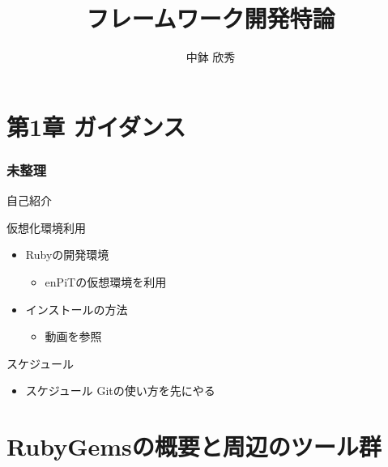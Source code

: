 \documentclass[t, aspectratio=169]{beamer}
\date{\insertpart}
\institute[AIIT]{産業技術大学院大学(AIIT)}
\author{中鉢 欣秀}
\date{}
\title{フレームワーク開発特論}
\begin{document}
\maketitle


\part{第1章 ガイダンス}
\label{sec-1}
\section{未整理}
\label{sec-1-1}
\begin{frame}[label=sec-1-1-1]{自己紹介}
\end{frame}

\begin{frame}[label=sec-1-1-2]{仮想化環境利用}
\begin{itemize}
\item Rubyの開発環境
\begin{itemize}
\item enPiTの仮想環境を利用
\end{itemize}
\item インストールの方法
\begin{itemize}
\item 動画を参照
\end{itemize}
\end{itemize}
\end{frame}

\begin{frame}[label=sec-1-1-3]{スケジュール}
\begin{itemize}
\item スケジュール
Gitの使い方を先にやる
\end{itemize}
\end{frame}


\part{RubyGemsの概要と周辺のツール群}
\label{sec-2}
\end{document}
